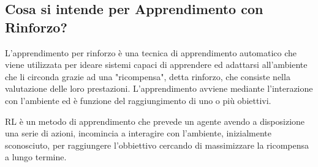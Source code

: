 \documentclass[\main/main.tex]{subfiles}
\begin{document}
\subsection{Cosa si intende per Apprendimento con Rinforzo?}
L'apprendimento per rinforzo è una tecnica di apprendimento automatico che viene utilizzata per ideare sistemi capaci di apprendere ed adattarsi all'ambiente che li circonda grazie ad una "ricompensa", detta rinforzo, che consiste nella valutazione delle loro prestazioni. L'apprendimento avviene mediante l'interazione con l'ambiente ed è funzione del raggiungimento di uno o più obiettivi.

RL è un metodo di apprendimento che prevede un agente avendo a disposizione una serie di azioni, incomincia a interagire con l'ambiente, inizialmente sconosciuto, per raggiungere l'obbiettivo cercando di massimizzare la ricompensa a lungo termine.
\end{document}

